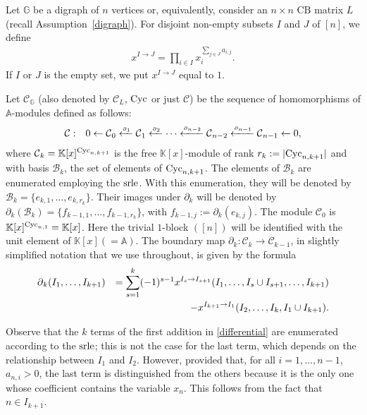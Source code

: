 \documentclass[ALCO]{cedram}
\newcommand{\mbk}{\mbox{$\mathbb{K}$}}
\newcommand{\mba}{\mbox{$\mathbb{A}$}}
\newcommand{\mbg}{\mbox{$\mathbb{G}$}}
\newcommand{\mcb}{\mbox{$\mathcal{B}$}}
\newcommand{\mcc}{\mbox{$\mathcal{C}$}}
\newcommand{\cb}{\mbox{$\mathrm{CB}$}}
\newcommand{\dif}{\mbox{$\partial$}}
\newcommand{\sdif}{\mbox{\tiny $\partial$}}
\newcommand{\cyc}{\mbox{${\rm Cyc}$}}
\newcommand{\srle}{\mbox{${\rm srle}$}}
\begin{document}
 Let $\mbg$ be a digraph of $n$ vertices or, equivalently,
consider an $n\times n$ $\cb$ matrix $L$ (recall
Assumption~\ref{digraph}). For disjoint non-empty subsets $I$ and $J$
of $[n]$, we define
\begin{eqnarray*}
x^{I\to J}=\prod_{i\in I}x_{i}^{\sum_{j\in J}a_{i,j}}.
\end{eqnarray*}
If $I$ or $J$ is the empty set, we put $x^{I\to J}$ equal to $1$.

\begin{definition}\label{cyccomplex}
Let $\mcc_{\mathbb{G}}$ (also denoted by $\mcc_L$, $\cyc$ or just
$\mcc$) be the sequence of homomorphisms of $\mba$-modules defined as
follows:
\begin{eqnarray*}
\mcc &:& 0\leftarrow \mcc_0\xleftarrow{\sdif_1} \mcc_1
\xleftarrow{\sdif_2} \cdots \xleftarrow{\sdif_{n-2}} \mcc_{n-2}
\xleftarrow{\sdif_{n-1}}\mcc_{n-1}\xleftarrow{} 0,
\end{eqnarray*}
where $\mcc_k=\mbk[x]^{{\rm Cyc}_{n,k+1}}$ is the free
$\mbk[x]$-module of rank $r_k:=\lvert\cyc_{n,k+1}\rvert$ and with
basis $\mcb_{k}$, the set of elements of $\cyc_{n,k+1}$. The elements
of $\mcb_k$ are enumerated employing the $\srle$. With this
enumeration, they will be denoted by $\mcb_{k}=\{e_{k,1},\ldots
,e_{k,r_k}\}$. Their images under $\dif_k$ will be denoted by
$\dif_{k}(\mcb_{k})=\{f_{k-1,1},\ldots ,f_{k-1,r_k}\}$, with
$f_{k-1,j}:=\dif_k(e_{k,j})$. The module $\mcc_0$ is $\mbk[x]^{{\rm
    Cyc}_{n,1}}=\mbk[x]$. Here the trivial $1$-block $([n])$ will be
identified with the unit element of $\mbk[x](=\mba)$.  The boundary
map $\dif_{k}:\mcc_k\to\mcc_{k-1}$, in slightly simplified notation
that we use throughout, is given by the formula
\begin{eqnarray}\label{differential}
\dif_{k}(I_1,\ldots,I_{k+1}) & &= \sum_{s=1}^{k}(-1)^{s-1}x^{I_s\to
  I_{s+1}}(I_1,\ldots ,I_s\cup I_{s+1},\ldots ,I_{k+1}) \\ &&
-x^{I_{k+1}\to I_1}(I_2,\ldots,I_{k},I_1\cup I_{k+1}). \notag
\end{eqnarray}
\end{definition}

\begin{remark}\label{dif-and-enum}
Observe that the $k$ terms of the first addition in
\eqref{differential} are enumerated according to the $\srle$; this is
not the case for the last term, which depends on the relationship
between $I_1$ and $I_2$. However, provided that, for all $i=1,\ldots
,n-1$, $a_{n,i}> 0$, the last term is distinguished from the others
because it is the only one whose coefficient contains the variable
$x_n$. This follows from the fact that $n\in I_{k+1}$.
\end{remark}
\end{document}
